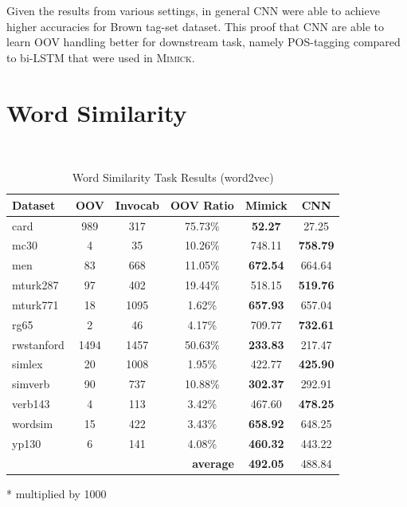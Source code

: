       Given the results from various settings, in general CNN were
      able to achieve higher accuracies for Brown tag-set dataset.
      This proof that CNN are able to learn OOV handling better for
      downstream task, namely POS-tagging compared to bi-LSTM that
      were used in \textsc{Mimick}.

    \section{Word Similarity}
    \begin{table}[!ht]
      \begin{threeparttable} 
      \begin{center}
        \caption{Word Similarity Task Results (word2vec)}
        ~\\
        \label{tab:wordsim:word2vec}
        \begin{tabular}{l|c|c|c|c|c}
          \textbf{Dataset} & \textbf{OOV} & \textbf{Invocab} & \textbf{OOV Ratio} & \textbf{Mimick}\tnote{*} & \textbf{CNN}\tnote{*}\\
          \hline
          card & 989 & 317 & 75.73\% & \textbf{52.27} & 27.25\\
          mc30 & 4 & 35 & 10.26\% & 748.11 & \textbf{758.79}\\
          men & 83 & 668 & 11.05\% & \textbf{672.54} & 664.64\\
          mturk287 & 97 & 402 & 19.44\% & 518.15 & \textbf{519.76}\\
          mturk771 & 18 & 1095 & 1.62\% & \textbf{657.93} & 657.04\\
          rg65 & 2 & 46 & 4.17\% & 709.77 & \textbf{732.61}\\
          rwstanford & 1494 & 1457 & 50.63\% & \textbf{233.83} & 217.47\\
          simlex & 20 & 1008 & 1.95\% & 422.77 & \textbf{425.90}\\
          simverb & 90 & 737 & 10.88\% & \textbf{302.37} & 292.91\\
          verb143 & 4 & 113 & 3.42\% & 467.60 & \textbf{478.25}\\
          wordsim & 15 & 422 & 3.43\% & \textbf{658.92} & 648.25\\
          yp130 & 6 & 141 & 4.08\% & \textbf{460.32} & 443.22\\
          \hline
          \multicolumn{4}{r|}{\textbf{average}} & \textbf{492.05} & 488.84\\
        \end{tabular}
        \begin{tablenotes}
          \item[*] multiplied by 1000
        \end{tablenotes}
      \end{center}
      
    \end{threeparttable} 
    \end{table}
